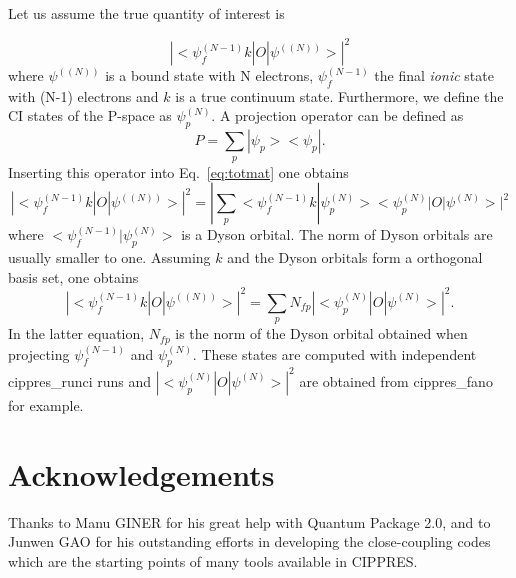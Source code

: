 \documentclass[a4paper, 10 pt]{report}
\begin{document}
Let us assume the true quantity of interest is 

\begin{equation}\label{eq:totmat}
|<\psi_f^{(N-1)} k|O|\psi^{((N))}>|^2
\end{equation}
where $\psi^{((N))}$ is a bound state with N electrons, $\psi_f^{(N-1)}$ the final \textit{ionic} state with (N-1) electrons and $k$ is a true continuum state. Furthermore, we define the CI states of the P-space as $\psi_p^{(N)}$. A projection operator can be defined as 
\begin{equation}
P=\sum_p|\psi_p><\psi_p|.
\end{equation}
Inserting this operator into Eq.~\ref{eq:totmat} one obtains
\begin{equation}
|<\psi_f^{(N-1)} k|O|\psi^{((N))}>|^2=|\sum_p<\psi_f^{(N-1)} k|\psi_p^{(N)}><\psi_p^{(N)}|O|\psi^{(N)}>|^2
\end{equation}
where $<\psi_f^{(N-1)}|\psi_p^{(N)}>$ is a Dyson orbital. The norm of Dyson orbitals are usually smaller to one. Assuming $k$ and the Dyson orbitals form a orthogonal basis set, one obtains
\begin{equation}
|<\psi_f^{(N-1)} k|O|\psi^{((N))}>|^2=\sum_p N_{fp}|<\psi_p^{(N)}|O|\psi^{(N)}>|^2.
\end{equation}
In the latter equation, $N_{fp}$ is the norm of the Dyson orbital obtained when projecting $\psi_f^{(N-1)}$ and $\psi_p^{(N)}$. These states are computed with independent cippres\_runci runs and $|<\psi_p^{(N)}|O|\psi^{(N)}>|^2$ are obtained from cippres\_fano for example.
\newpage

\chapter*{Acknowledgements}
Thanks to Manu GINER for his great help with Quantum Package 2.0, and to Junwen GAO for his outstanding efforts in developing the close-coupling codes which are the starting points of many tools available in CIPPRES.
\newpage



\newpage

%

\end{document}
